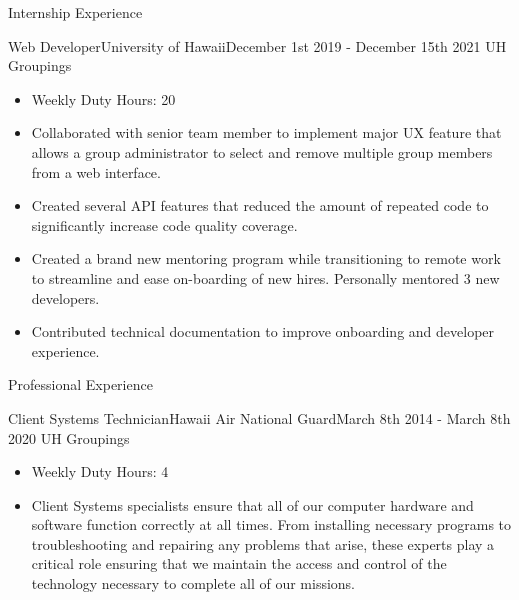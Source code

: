 \documentclass[]{mcdowellcv}
\begin{document}
	\makeheader
	
	\begin{cvsection}{Internship Experience}
		\begin{cvsubsection}{Web Developer}{University of Hawaii}{December 1st 2019 - December 15th 2021}
			UH Groupings
			\begin{itemize}
				\item Weekly Duty Hours: 20
				\item Collaborated with senior team member to implement major UX feature that allows a group administrator to select and remove multiple group members from a web interface.
				\item Created several API features that reduced the amount of repeated code to significantly increase code quality coverage.
				\item Created a brand new mentoring program while transitioning to remote work to streamline and ease on-boarding of new hires. Personally mentored 3 new developers.
				\item Contributed technical documentation to improve onboarding and developer experience.
			\end{itemize}
		\end{cvsubsection}
		
	\end{cvsection}

	\begin{cvsection}{Professional Experience}
	\begin{cvsubsection}{Client Systems Technician}{Hawaii Air National Guard}{March 8th 2014 - March 8th 2020}
		UH Groupings
		\begin{itemize}
			\item Weekly Duty Hours: 4
			\item Client Systems specialists ensure that all of our computer hardware and software function correctly at all times. From installing necessary programs to troubleshooting and repairing any problems that arise, these experts play a critical role ensuring that we maintain the access and control of the technology necessary to complete all of our missions.
		\end{itemize}
	\end{cvsubsection}
		
	\end{cvsection}
\end{document}
